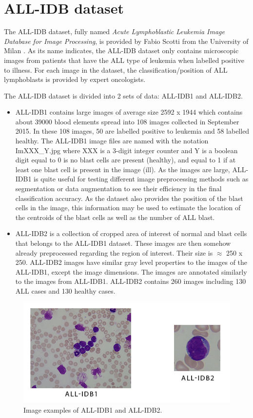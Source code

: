 \documentclass[11pt, openany]{report}
\theoremstyle{plain}
\theoremstyle{definition}
\theoremstyle{remark}
\begin{document}
\newpage
\section{ALL-IDB dataset} \label{sec:all-idb}
The ALL-IDB dataset, fully named \textit{Acute Lymphoblastic Leukemia Image Database for Image Processing}, is provided by Fabio Scotti from the University of Milan \cite{ALL-IDB}. As its name indicates, the ALL-IDB dataset only contains microscopic images from patients that have the ALL type of leukemia when labelled positive to illness. For each image in the dataset, the classification/position of ALL lymphoblasts is provided by expert oncologists. 

The ALL-IDB dataset is divided into 2 sets of data: ALL-IDB1 and ALL-IDB2. 
\begin{itemize}
\item ALL-IDB1 contains large images of average size 2592 x 1944 which contains about 39000 blood elements spread into 108 images collected in September 2015. In these 108 images, 50 are labelled positive to leukemia and 58 labelled healthy. The ALL-IDB1 image files are named with the notation ImXXX\_Y.jpg where XXX is a 3-digit integer counter and Y is a boolean digit equal to 0 is no blast cells are present (healthy), and equal to 1 if at least one blast cell is present in the image (ill). As the images are large, ALL-IDB1 is quite useful for testing different image preprocessing methods such as segmentation or data augmentation to see their efficiency in the final classification accuracy.  As the dataset also provides the position of the blast cells in the image, this information may be used to estimate the location of the centroids of the blast cells as well as the number of ALL blast.  

\item ALL-IDB2 is a collection of cropped area of interest of normal and blast cells that belongs to the ALL-IDB1 dataset. These images are then somehow already preprocessed regarding the region of interest. Their size is $\approx$ 250 x 250. ALL-IDB2 images have similar gray level properties to the images of the ALL-IDB1, except the image dimensions. The images are annotated similarly to the images from ALL-IDB1. ALL-IDB2 contains 260 images including 130 ALL cases and 130 healthy cases.  
\end{itemize}


\begin{figure}[H]
  \centering
  \includegraphics[scale=1]{figures/all-idb.PNG}
  \caption{Image examples of ALL-IDB1 and ALL-IDB2.}
  \label{fig:all-idb}
\end{figure}
\end{document}
